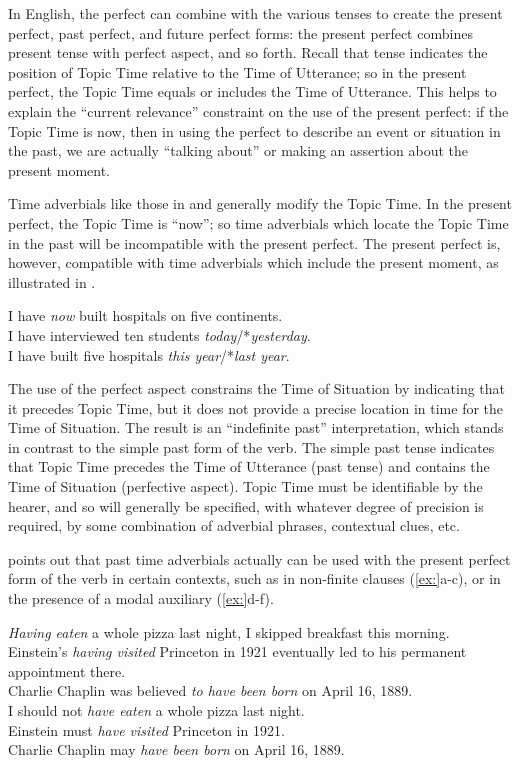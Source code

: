 In English, the perfect can combine with the various tenses to create the present perfect, past perfect, and future perfect forms: the present perfect combines present tense with perfect aspect, and so forth. Recall that tense indicates the position of Topic Time relative to the Time of Utterance; so in the present perfect, the Topic Time equals or includes the Time of Utterance. This helps to explain the “current relevance” constraint on the use of the present perfect: if the Topic Time is now, then in using the perfect to describe an event or situation in the past, we are actually “talking about” or making an assertion about the present moment.



Time adverbials like those in  and  generally modify the Topic Time. In the present perfect, the Topic Time is “now”; so time adverbials which locate the Topic Time in the past will be incompatible with the present perfect. The present perfect is, however, compatible with time adverbials which include the present moment, as illustrated in .


\ea
\ea I have \textit{now} built hospitals on five continents.\\
\ex I have interviewed ten students \textit{today}/*\textit{yesterday}.\\
\ex I have built five hospitals \textit{this year}/*\textit{last year}.
                       \z
\z


The use of the perfect aspect constrains the Time of Situation by indicating that it precedes Topic Time, but it does not provide a precise location in time for the Time of Situation. The result is an “indefinite past” interpretation, which stands in contrast to the simple past form of the verb. The simple past tense indicates that Topic Time precedes the Time of Utterance (past tense) and contains the Time of Situation (perfective aspect). Topic Time must be identifiable by the hearer, and so will generally be specified, with whatever degree of precision is required, by some combination of adverbial phrases, contextual clues, etc.



\citet[55]{Comrie1976} points out that past time adverbials actually can be used with the present perfect form of the verb in certain contexts, such as in non-finite clauses (\ref{ex:}a-c), or in the presence of a modal auxiliary (\ref{ex:}d-f).


\ea
\ea \textit{Having eaten} a whole pizza last night, I skipped breakfast this morning.\\
\ex Einstein’s \textit{having visited} Princeton in 1921 eventually led to his permanent\\
  appointment there.\\
\ex Charlie Chaplin was believed \textit{to have been born} on April 16, 1889.\\
\ex I should not \textit{have eaten} a whole pizza last night.\\
\ex Einstein must \textit{have visited} Princeton in 1921.\\
\ex Charlie Chaplin may \textit{have been born} on April 16, 1889.
                       \z
\z


